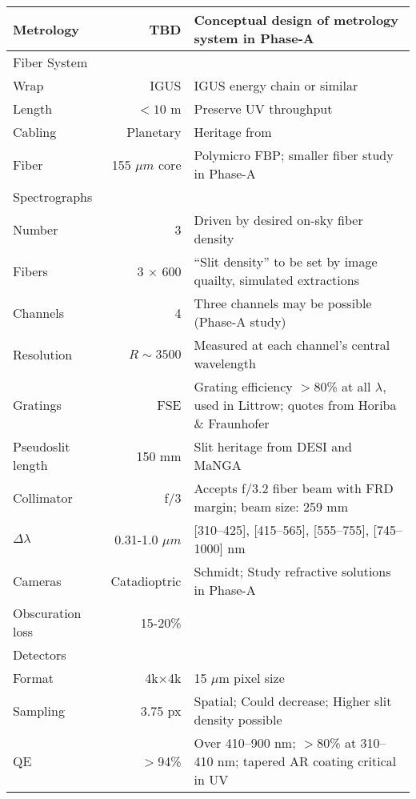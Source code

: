 \begin{table}[h!]
\begin{tabular}{l r l}
\hspace{0.2cm} Metrology & TBD & Conceptual design of metrology system in Phase-A \\
\hline
Fiber System \\
\hline
\hspace{0.2cm} Wrap & IGUS & IGUS energy chain or similar \citep[e.g.,][]{poppett16}  \\
\hspace{0.2cm} Length & $<10$ m & Preserve UV throughput  \\
\hspace{0.2cm} Cabling & Planetary & Heritage from \citet{soukup10}  \\
\hspace{0.2cm} Fiber & 155 $\mu m$ core & Polymicro FBP; smaller fiber study in Phase-A \\
\hline
Spectrographs \\
\hline
\hspace{0.2cm} Number & 3 & Driven by desired on-sky fiber density \\
\hspace{0.2cm} Fibers & 3 $\times$ 600 & ``Slit density'' to be set by image quailty, simulated extractions \\
\hspace{0.2cm} Channels & 4 & Three channels may be possible (Phase-A study) \\
\hspace{0.2cm} Resolution & $R \sim 3500$ & Measured at each channel's central wavelength \\
\hspace{0.2cm} Gratings & FSE & Grating efficiency $>$80\% at all $\lambda$, used in Littrow; quotes from Horiba \& Fraunhofer \\
\hspace{0.2cm} Pseudoslit length & 150 mm & Slit heritage from DESI and MaNGA \\
\hspace{0.2cm} Collimator & f/3 & Accepts f/3.2 fiber beam with FRD margin; beam size: 259 mm \\
\hspace{0.2cm} $\Delta\lambda$ & 0.31-1.0 $\mu m$ & [310--425], [415--565], [555--755], [745--1000] nm \\
\hspace{0.2cm} Cameras & Catadioptric & Schmidt; Study refractive solutions in Phase-A \\
\hspace{0.3cm} Obscuration loss & 15-20\% &  \\
\hline
Detectors \\
\hline
\hspace{0.2cm} Format & 4k$\times$4k & 15 $\mu$m pixel size \\
\hspace{0.2cm} Sampling & 3.75 px & Spatial; Could decrease; Higher slit density possible \\
\hspace{0.2cm} QE & $>$94\% & Over 410--900 nm; $>$80\% at 310--410 nm; tapered AR coating critical in UV \\
\hline





\end{tabular}
\end{table}
